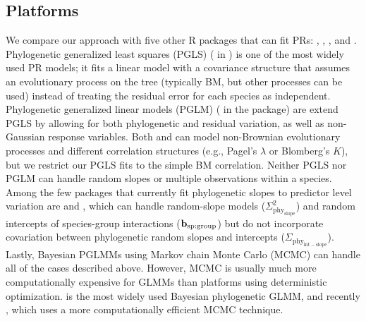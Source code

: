 \documentclass[12pt]{article}
\begin{document}
\subsection*{Platforms}

We compare our approach with five other R packages that can fit PRs:  \citep{pinheiro2014r},  \citep{ho2014phylolm},  \citep{pearse2015pez},  \citep{phyr} and  \citep{burkner2018brms}.
Phylogenetic generalized least squares (PGLS) ( in ) is one of the most widely used PR models; it fits a linear model with a covariance structure that assumes an evolutionary process on the tree (typically BM, but other processes can be used) instead of treating the residual error for each species as independent.
Phylogenetic generalized linear models (PGLM) ( in the  package) are extend PGLS by allowing for both phylogenetic and residual variation, as well as non-Gaussian response variables.
Both  and  can model non-Brownian evolutionary processes and different correlation structures (e.g., Pagel's $\lambda$ or Blomberg's $K$), but we restrict our PGLS fits to the simple BM correlation.
Neither PGLS nor PGLM can handle random slopes or multiple observations within a species.
Among the few packages that currently fit phylogenetic slopes to predictor level variation are  and , which can handle random-slope models ($\Sigma^2_{\mathrm{phy_{slope}}}$) and random intercepts of species-group interactions ($\bf{b_{\mathrm{sp:group}}}$) but do not incorporate covariation between phylogenetic random slopes and intercepts ($\Sigma_{\mathrm{phy_{int-slope}}}$).
Lastly, Bayesian PGLMMs using Markov chain Monte Carlo (MCMC) can handle all of the cases described above. 
However, MCMC is usually much more computationally expensive for GLMMs than platforms using deterministic optimization.
 \citep{hadfield2010general} is the most widely used Bayesian phylogenetic GLMM, and recently , which uses a more computationally efficient MCMC technique.
 
\end{document}
